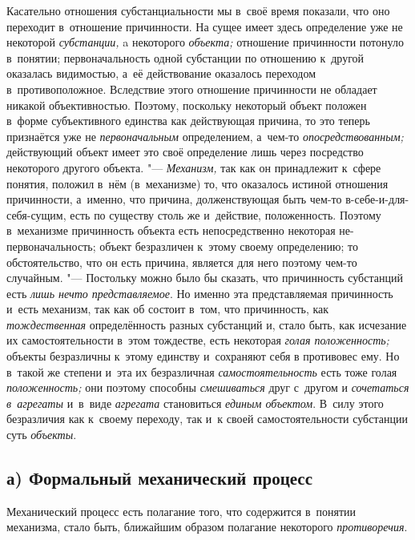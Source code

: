 Касательно отношения субстанциальности мы в~своё время
показали, что оно переходит в~отношение причинности. На сущее имеет здесь
определение уже не некоторой {\em субстанции,} a некоторого {\em объекта;}
отношение причинности потонуло в~понятии; первоначальность
одной субстанции по отношению к~другой оказалась видимостью, а~её
действование оказалось переходом в~противоположное. Вследствие этого
отношение причинности не обладает никакой объективностью. Поэтому,
поскольку некоторый объект положен в~форме субъективного единства как
действующая причина, то это теперь признаётся уже не {\em первоначальным}
определением, а~чем-то {\em опосредствованным;}
действующий объект имеет это своё определение лишь через
посредство некоторого другого объекта. "--- {\em Механизм,} так как он
принадлежит к~сфере понятия, положил в~нём (в~механизме) то, что оказалось
истиной отношения причинности, а~именно, что причина, долженствующая быть
чем-то в-себе-и-для-себя-сущим, есть по существу столь же и~действие,
положенность. Поэтому в~механизме причинность объекта есть непосредственно
некоторая не-первоначальность; объект безразличен к~этому своему
определению; то обстоятельство, что он есть причина, является для него
поэтому чем-то случайным. "--- Постольку можно было бы сказать,
что причинность субстанций есть {\em лишь нечто представляемое}.
Но именно эта представляемая причинность и~есть механизм, так
как об состоит в~том, что причинность, как {\em тождественная}
определённость разных субстанций и, стало быть, как исчезание
их самостоятельности в~этом тождестве, есть некоторая {\em голая положенность;}
объекты безразличны к~этому единству и~сохраняют себя в
противовес ему. Но в~такой же степени и~эта их безразличная
{\em самостоятельность} есть тоже голая {\em положенность;} они
поэтому способны {\em смешиваться} друг с~другом и {\em сочетаться в~агрегаты}
и~в~виде {\em агрегата} становиться {\em единым
объектом}. В~силу этого безразличия как к~своему переходу,
так и~к своей самостоятельности субстанции суть {\em объекты}.

\subsection[а) Формальный механический процесс]{а) Формальный механический процесс}

Механический процесс есть полагание того, что содержится в~понятии механизма,
стало быть, ближайшим образом полагание некоторого {\em противоречия}.

